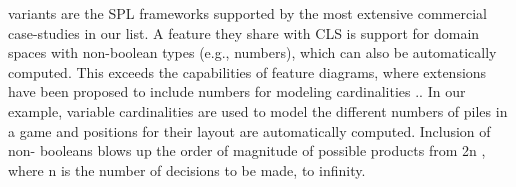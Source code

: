 variants are the SPL frameworks supported by the most extensive commercial case-studies in our list. A feature they
share with CLS is support for domain spaces with non-boolean types (e.g., numbers), which can also be automatically
computed. This exceeds the capabilities of feature diagrams, where extensions have been proposed to include numbers for
modeling cardinalities .\cite{Sousa:2016:EFM:2934466.2934475}. In our example, variable cardinalities are used to model
the different numbers of piles in a
 game and positions for their layout are automatically computed. Inclusion of non- booleans blows up
 the order of magnitude of possible products from 2n , where n is the number of decisions to be made, to infinity.
